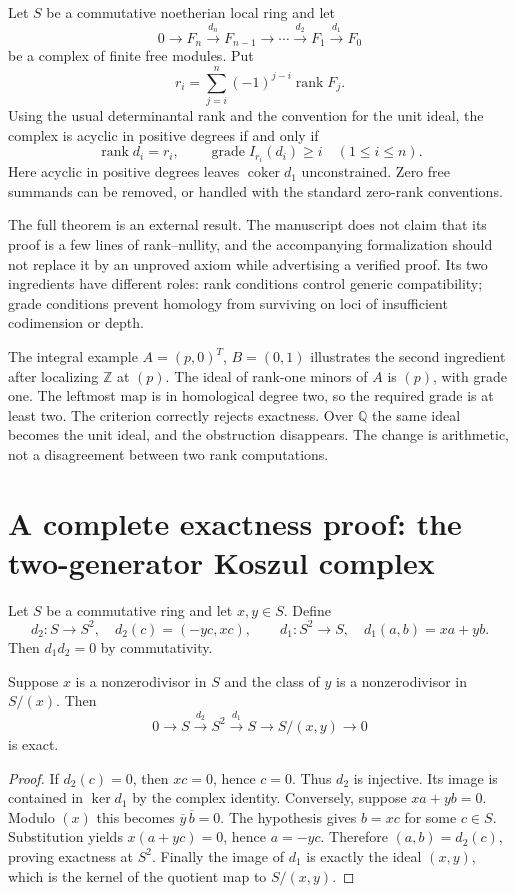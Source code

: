 \begin{theorem}
Let $S$ be a commutative noetherian local ring and let
\[
0\to F_n\xrightarrow{d_n}F_{n-1}\to\cdots
 \xrightarrow{d_2}F_1\xrightarrow{d_1}F_0
\]
be a complex of finite free modules. Put
\[
r_i=\sum_{j=i}^n(-1)^{j-i}\operatorname{rank}F_j.
\]
Using the usual determinantal rank and the convention for the unit ideal, the complex is acyclic in positive degrees if and only if
\[
\operatorname{rank}d_i=r_i,
\qquad \operatorname{grade}I_{r_i}(d_i)\geq i
\quad(1\leq i\leq n).
\]
Here acyclic in positive degrees leaves $\operatorname{coker}d_1$ unconstrained. Zero free summands can be removed, or handled with the standard zero-rank conventions.\cite{v2BE1973}
\end{theorem}

The full theorem is an external result. The manuscript does not claim that its proof is a few lines of rank--nullity, and the accompanying formalization should not replace it by an unproved axiom while advertising a verified proof. Its two ingredients have different roles: rank conditions control generic compatibility; grade conditions prevent homology from surviving on loci of insufficient codimension or depth.

The integral example $A=(p,0)^T$, $B=(0,1)$ illustrates the second ingredient after localizing $\mathbb Z$ at $(p)$. The ideal of rank-one minors of $A$ is $(p)$, with grade one. The leftmost map is in homological degree two, so the required grade is at least two. The criterion correctly rejects exactness. Over $\mathbb Q$ the same ideal becomes the unit ideal, and the obstruction disappears. The change is arithmetic, not a disagreement between two rank computations.

\section{A complete exactness proof: the two-generator Koszul complex}

Let $S$ be a commutative ring and let $x,y\in S$. Define
\[
d_2:S\to S^2,\quad d_2(c)=(-yc,xc),
\qquad
 d_1:S^2\to S,\quad d_1(a,b)=xa+yb.
\]
Then $d_1d_2=0$ by commutativity.

\begin{theorem}
Suppose $x$ is a nonzerodivisor in $S$ and the class of $y$ is a nonzerodivisor in $S/(x)$. Then
\[
0\to S\xrightarrow{d_2}S^2\xrightarrow{d_1}S
 \to S/(x,y)\to0
\]
is exact.
\end{theorem}
\begin{proof}
If $d_2(c)=0$, then $xc=0$, hence $c=0$. Thus $d_2$ is injective. Its image is contained in $\ker d_1$ by the complex identity. Conversely, suppose $xa+yb=0$. Modulo $(x)$ this becomes $\overline y\,\overline b=0$. The hypothesis gives $b=xc$ for some $c\in S$. Substitution yields $x(a+yc)=0$, hence $a=-yc$. Therefore $(a,b)=d_2(c)$, proving exactness at $S^2$. Finally the image of $d_1$ is exactly the ideal $(x,y)$, which is the kernel of the quotient map to $S/(x,y)$.
\end{proof}

